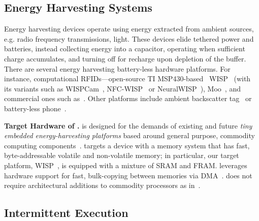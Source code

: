 \subsection{Energy Harvesting Systems}
\label{sec:background_harvesting}

Energy harvesting devices operate using energy extracted from ambient sources, e.g. radio frequency transmissions, light. These devices elide tethered power and batteries, instead collecting energy into a capacitor, operating when sufficient charge accumulates, and turning off for recharge upon depletion of the buffer. There are several energy harvesting battery-less hardware platforms. For instance, computational RFIDs---open-source TI MSP430-based~\cite{wolverine} WISP~\cite{wisp5} (with its variants such as WISPCam~\cite{naderiparizi_rfid_2015}, NFC-WISP~\cite{zhao_rfid_2015} or NeuralWISP~\cite{holleman_biocas_2008}), Moo~\cite{moo}, and commercial ones such as~\cite{medusa_farsens_2017}. Other platforms include ambient backscatter tag~\cite{liu_sigcomm_2013,parks_sigcomm_2014} or battery-less phone~\cite{talla_imwut_2017}. 

\textbf{Target Hardware of \sys.} \sys is designed for the demands of existing and future \emph{tiny embedded energy-harvesting platforms} based around general purpose, commodity computing components~\cite{wisp,msp430datasheet}. \sys targets a device with a memory system that has fast, byte-addressable volatile and non-volatile memory; in particular, our target platform, WISP~\cite{wisp}, is equipped with a mixture of SRAM and FRAM. \sys leverages hardware support for fast, bulk-copying between memories via DMA~\cite{msp430datasheet}. \sys does not require architectural additions to commodity processors as in~\cite{su_date_2017,hicks_isca_2017,quickrecall,nvp}.

\subsection{Intermittent Execution}
\label{sec:background_consistency}

